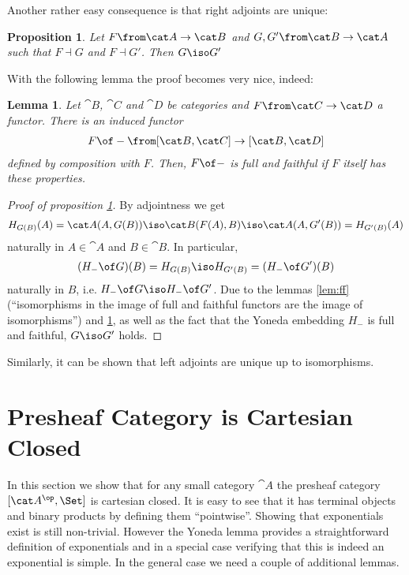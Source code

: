\documentclass{article}
\newtheorem{lemma}{Lemma}
\newtheorem{proposition}{Proposition}
\theoremstyle{definition}
\numberwithin{equation}{section}
\begin{document}
Another rather easy consequence is that right adjoints are unique:

\begin{proposition}
\label{prop:unique}
  Let $F\from \cat A\to\cat B$ and $G,G'\from\cat B\to\cat A$ such that $F\dashv G$ and $F\dashv G'$. Then $G\iso G'$
\end{proposition}
With the following lemma the proof becomes very nice, indeed:
\begin{lemma}
  \label{lem:comp}
  Let $\cat B$, $\cat C$ and $\cat D$ be categories and $F\from\cat C\to\cat D$ a functor. There is an induced functor
  \begin{align*}
    F\of -\from[\cat B,\cat C]\to [\cat B,\cat D]
  \end{align*}
  defined by composition with $F$. 
Then, $F\of -$ is full and faithful if $F$ itself has these properties.  
\end{lemma}
\begin{proof}[Proof of proposition \ref{prop:unique}]

  By adjointness we get
    \begin{align*}
      H_{G(B)}(A)=\cat A(A,G(B))\iso\cat B(F(A),B)\iso\cat A(A,G'(B))=H_{G'(B)}(A)
    \end{align*}
    naturally in $A\in\cat A$ and $B\in\cat B$. In particular,
    \begin{align*}
      (H_-\of G)(B)=H_{G(B)}\iso H_{G'(B)}=(H_-\of G')(B)
    \end{align*}
    naturally in $B$, i.e. $H_-\of G\iso H_-\of G'$. Due to the lemmas \ref{lem:ff} (``isomorphisms in the image of full and faithful functors are the image of isomorphisms'') and \ref{lem:comp}, as well as the fact that the Yoneda embedding $H_-$ is full and faithful, $G\iso G'$ holds.
\end{proof}
Similarly, it can be shown that left adjoints are unique up to isomorphisms.

\section{Presheaf Category is Cartesian Closed}
In this section we show that for any small category $\cat A$ the presheaf category $[\cat A^\op,\Set]$ is cartesian closed. It is easy to see that it has terminal objects and binary products by defining them ``pointwise''. Showing that exponentials exist is still non-trivial. However the Yoneda lemma provides a straightforward definition of exponentials and in a special case verifying that this is indeed an exponential is simple. In the general case we need a couple of additional lemmas.
\end{document}
